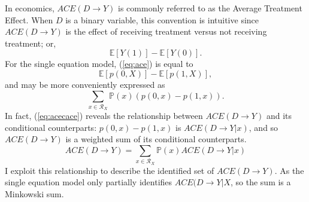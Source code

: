 \documentclass[12pt,a4paper,twoside]{article}
\numberwithin{equation}{section}
\begin{document}
In economics, $ACE(D\rightarrow Y)$ is commonly referred to as the Average Treatment Effect. When $D$ is a binary variable, this convention is intuitive since $ACE(D\rightarrow Y)$ is the effect of receiving treatment versus not receiving treatment; or,
\begin{equation}
\mathbb{E}[Y(1)]-\mathbb{E}[Y(0)].\label{eq:ace}
\end{equation}
For the single equation model, (\ref{eq:ace}) is equal to
\[\mathbb{E}[p(0,X)]-\mathbb{E}[p(1,X)],\]
and may be more conveniently expressed as
\begin{equation}
\sum_{x\in\mathcal{R}_X}\mathbb{P}(x)(p(0,x)-p(1,x)).\label{eq:acecace}
\end{equation}
In fact, (\ref{eq:acecace}) reveals the relationship between $ACE(D\rightarrow Y)$ and its conditional counterparts: $p(0,x)-p(1,x)$ is $ACE(D\rightarrow Y|x)$, and so $ACE(D\rightarrow Y)$ is a weighted sum of its conditional counterparts.
\[ACE(D\rightarrow Y)=\sum_{x\in\mathcal{R}_X}\mathbb{P}(x)ACE(D\rightarrow Y|x)\] 
I exploit this relationship to describe the identified set of $ACE(D\rightarrow Y)$. As the single equation model only partially identifies $ACE(D\rightarrow Y|X$, so the sum is a Minkowski sum.
\end{document}
